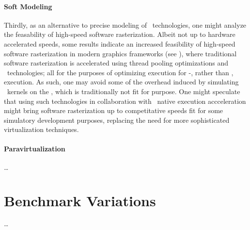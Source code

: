 \paragraph{Soft Modeling}
\label{par:analysis_softmodeling}
Thirdly, as an alternative to precise modeling of \dvttermgpu\ technologies, one might analyze the feasability of high-speed software rasterization.
Albeit not up to hardware accelerated speeds, some results indicate an increased feasibility of high-speed software rasterization in modern graphics frameworks (see ), where traditional software rasterization is accelerated using thread pooling optimizations and \dvttermsimd\ technologies; all for the purposes of optimizing execution for \dvttermcpu -, rather than \dvttermgpu , execution.
As such, one may avoid some of the overhead induced by simulating \dvttermgpu\ kernels on the \dvttermcpu , which is traditionally not fit for purpose.
One might speculate that using such technologies in collaboration with \dvttermhost\ native execution accceleration might bring software rasterization up to competitative speeds fit for some simulatory development purposes, replacing the need for more sophisticated virtualization techniques.

\paragraph{Paravirtualization}
\label{par:analysis_paravirtualization}
\ldots



\section{Benchmark Variations}
\label{sec:analysis_benchmarkvariations}
\ldots



